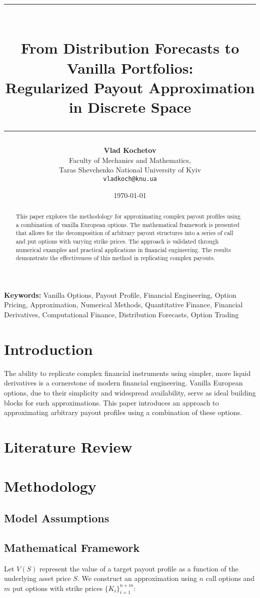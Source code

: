 \documentclass[12pt]{article}
\title{\rule{\textwidth}{4pt}\\
\textbf{From Distribution Forecasts to Vanilla Portfolios: \\[0.2cm]
Regularized Payout Approximation in Discrete Space}\\[0.2cm]
\rule{\textwidth}{2pt}}
\author{\small \textbf{Vlad Kochetov} \\
    \small Faculty of Mechanics and Mathematics, \\
    \small Taras Shevchenko National University of Kyiv \\
    \small \texttt{vladkoch@knu.ua}
}
\date{\today}
\providecommand{\keywords}[1]{\textbf{Keywords:} #1}
\begin{document}
\maketitle

\begin{abstract}
This paper explores the methodology for approximating complex payout profiles using a
combination of vanilla European options. The mathematical framework is presented that
allows for the decomposition of arbitrary payout structures into a series of call and
put options with varying strike prices. The approach is validated through numerical
examples and practical applications in financial engineering. The results demonstrate
the effectiveness of this method in replicating complex payouts.
\end{abstract}

\newpage

\keywords{
    \small{
        Vanilla Options, 
        Payout Profile, 
        Financial Engineering, 
        Option Pricing, 
        Approximation, 
        Numerical Methods,
        Quantitative Finance,
        Financial Derivatives,
        Computational Finance,
        Distribution Forecasts,
        Option Trading
    }
}

\section{Introduction}
The ability to replicate complex financial instruments using simpler, more liquid
derivatives is a cornerstone of modern financial engineering. Vanilla European options,
due to their simplicity and widespread availability, serve as ideal building blocks
for such approximations. This paper introduces an approach to approximating arbitrary
payout profiles using a combination of these options.

\section{Literature Review}

\section{Methodology}
\subsection{Model Assumptions}

\subsection{Mathematical Framework}
Let \( V(S) \) represent the value of a target payout profile as a function of the underlying asset price \( S \). We construct an approximation using \( n \) call options and \( m \) put options with strike prices \( \{K_i\}_{i=1}^{n+m} \):
\end{document}
